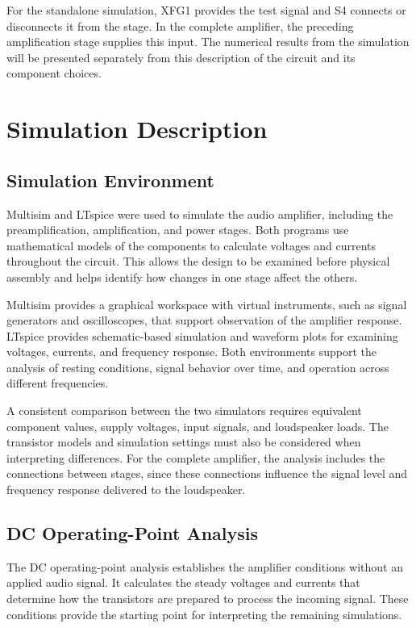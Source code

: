 \documentclass[conference]{IEEEtran}
\begin{document}
For the standalone simulation, XFG1 provides the test signal and S4 connects or disconnects it from the stage. In the complete amplifier, the preceding amplification stage supplies this input. The numerical results from the simulation will be presented separately from this description of the circuit and its component choices.

\section{Simulation Description}

\subsection{Simulation Environment}
Multisim and LTspice were used to simulate the audio amplifier, including the preamplification, amplification, and power stages. Both programs use mathematical models of the components to calculate voltages and currents throughout the circuit. This allows the design to be examined before physical assembly and helps identify how changes in one stage affect the others.

Multisim provides a graphical workspace with virtual instruments, such as signal generators and oscilloscopes, that support observation of the amplifier response. LTspice provides schematic-based simulation and waveform plots for examining voltages, currents, and frequency response. Both environments support the analysis of resting conditions, signal behavior over time, and operation across different frequencies.

A consistent comparison between the two simulators requires equivalent component values, supply voltages, input signals, and loudspeaker loads. The transistor models and simulation settings must also be considered when interpreting differences. For the complete amplifier, the analysis includes the connections between stages, since these connections influence the signal level and frequency response delivered to the loudspeaker.

\subsection{DC Operating-Point Analysis}
The DC operating-point analysis establishes the amplifier conditions without an applied audio signal. It calculates the steady voltages and currents that determine how the transistors are prepared to process the incoming signal. These conditions provide the starting point for interpreting the remaining simulations.
\end{document}
